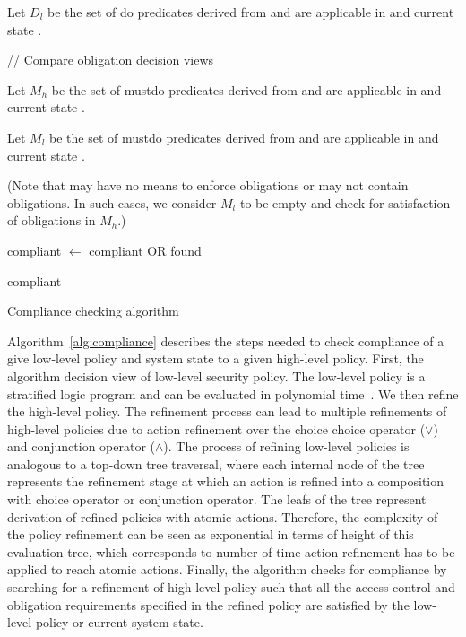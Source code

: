 \documentclass[12pt,journal,letterpaper,onecolumn]{IEEEtran}
\begin{document}
\begin{algorithm}[!hb]
{    Let $D_l$ be the set of {\ttfamily do} predicates derived from \LLP
    and are applicable in \DataSystem and current state \State. \;




    \BlankLine

    // Compare obligation decision views \;

    Let $M_h$ be the set of {\ttfamily mustdo} predicates derived from \HLP
    and are applicable in \DataSystem and current state \State. \;

    Let $M_l$ be the set of {\ttfamily mustdo} predicates derived from \LLP
    and are applicable in \DataSystem and current state \State. \;

    (Note that \LLP may have no means to enforce obligations or \LLP may not
      contain obligations. In such cases, we consider $M_l$ to be empty and check
      for satisfaction of obligations in $M_h$.) \;


    compliant $\leftarrow$ compliant OR found \;

}

\Return compliant \;

\caption{Compliance checking algorithm} 
\label{alg:compliance}
\end{algorithm}

Algorithm~\ref{alg:compliance} describes the steps needed to 
check compliance of a give low-level policy and system state
to a given high-level policy. 
First, the algorithm decision view of low-level security policy. 
The low-level policy is a stratified logic program and can be 
evaluated in polynomial time~\cite{Jajodia01}. We then refine the 
high-level policy. The refinement process can lead to multiple
refinements of high-level policies due to action refinement over
the choice choice operator ($\vee$) and conjunction operator 
($\wedge$). The process of refining low-level policies is analogous 
to a top-down tree traversal, where each internal node of the tree
represents the refinement stage at which an action is refined into a 
composition with choice operator or conjunction operator. The leafs 
of the tree represent derivation of refined policies with atomic actions.
Therefore, the complexity of the policy refinement can be seen
as exponential in terms of height of this evaluation tree, which 
corresponds to number of time action refinement has to be 
applied to reach atomic actions. Finally, the algorithm checks for
compliance by searching for a refinement of high-level policy such 
that all the access control and obligation requirements
specified in the refined policy are satisfied
by the low-level policy or current system state. 
\end{document}
